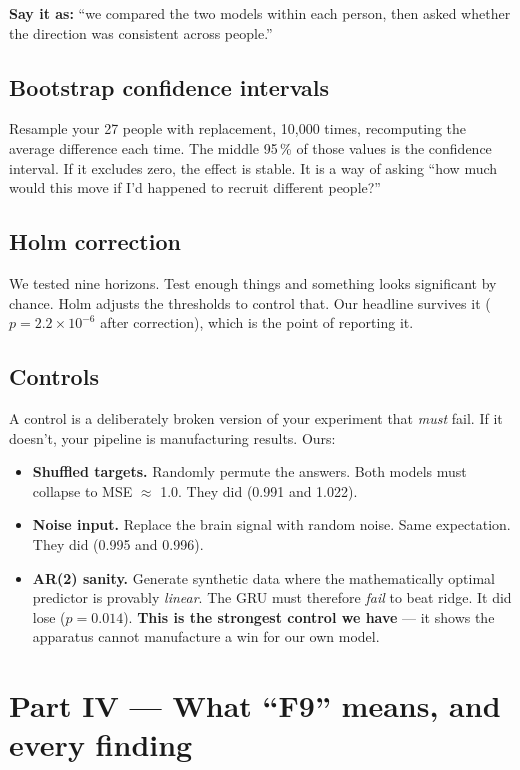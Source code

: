 \documentclass[11pt]{article}
\begin{document}
\textbf{Say it as:} ``we compared the two models within each person, then asked
whether the direction was consistent across people.''

\subsection{Bootstrap confidence intervals}

Resample your 27 people with replacement, 10{,}000 times, recomputing the average
difference each time. The middle 95\,\% of those values is the confidence
interval. If it excludes zero, the effect is stable. It is a way of asking ``how
much would this move if I'd happened to recruit different people?''

\subsection{Holm correction}

We tested nine horizons. Test enough things and something looks significant by
chance. Holm adjusts the thresholds to control that. Our headline survives it
($p = 2.2\times10^{-6}$ after correction), which is the point of reporting it.

\subsection{Controls}

A control is a deliberately broken version of your experiment that \emph{must}
fail. If it doesn't, your pipeline is manufacturing results. Ours:

\begin{itemize}
\item \textbf{Shuffled targets.} Randomly permute the answers. Both models must
collapse to MSE $\approx$ 1.0. They did (0.991 and 1.022).
\item \textbf{Noise input.} Replace the brain signal with random noise. Same
expectation. They did (0.995 and 0.996).
\item \textbf{AR(2) sanity.} Generate synthetic data where the mathematically
optimal predictor is provably \emph{linear}. The GRU must therefore \emph{fail} to
beat ridge. It did lose ($p = 0.014$). \textbf{This is the strongest control we
have} --- it shows the apparatus cannot manufacture a win for our own model.
\end{itemize}

\section{Part IV --- What ``F9'' means, and every finding}
\end{document}
